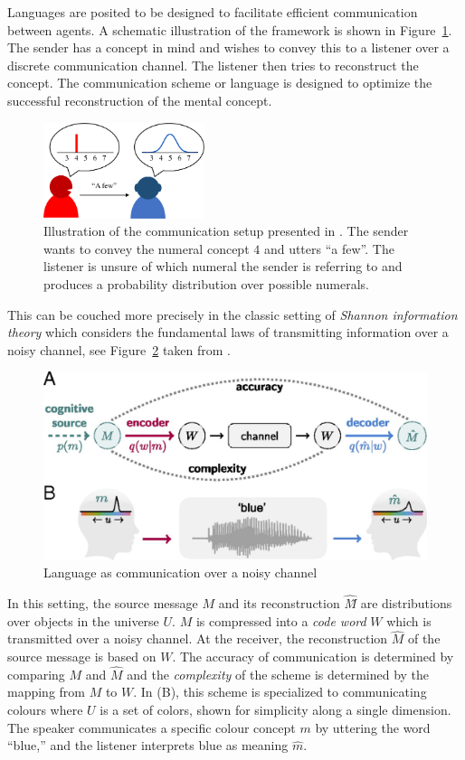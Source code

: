 \documentclass{article}
\begin{document}
Languages are posited to be designed to facilitate efficient communication between agents. A schematic illustration of the framework is shown in Figure~\ref{fig:regier_model}. The sender has a concept in mind and wishes to convey this to a listener over a discrete communication channel. The listener then tries to reconstruct the concept. The communication scheme or language is designed to optimize the successful reconstruction of the mental concept.
\begin{figure}[t]
\centering
\includegraphics[width=0.42\textwidth]{Figures/regier_model_2.pdf}
\caption{Illustration of the communication setup presented in \citet{Xu2020}. The sender wants to convey the numeral concept $4$ and utters ``a few''. The listener is unsure of which numeral the sender is referring to and produces a probability distribution over possible numerals.}\label{fig:regier_model} 
\end{figure}

This can be couched more precisely in the classic setting  of \emph{Shannon information theory} \cite{CT06} which considers the fundamental laws of transmitting information over a noisy channel, see Figure~\ref{fig:comm} taken from \cite{ZKRT18}.
\begin{figure}
    \centering
    \includegraphics{Figures/comm.jpg}
    \caption{Language as communication over a noisy channel}
    \label{fig:comm}
\end{figure}
In this setting, the source message $M$ and its reconstruction $\hat{M}$̂ are distributions over objects in the universe $U$. $M$ is compressed into a \emph{code word} $W$ which is transmitted over a noisy channel. At the receiver, the reconstruction $\hat{M}$ 
of the source message is based on $W$. The accuracy of communication is determined by comparing $M$ and $\hat{M}$ and the \emph{complexity} of the scheme is determined by the mapping from $M$ to $W$. In (B), this scheme is specialized to communicating colours where $U$ is a set of colors, shown for simplicity along a single dimension. The speaker communicates a specific colour concept $m$ by uttering the word “blue,” and the listener interprets blue as meaning $\hat{m}$. 
\end{document}

